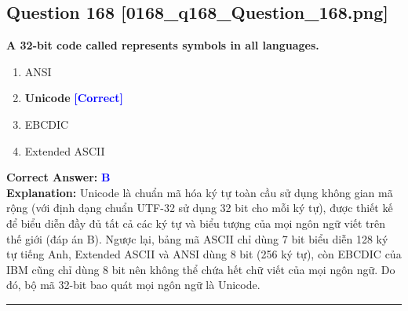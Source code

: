 \documentclass[11pt,a4paper]{article}
\begin{document}
\begin{minipage}{\textwidth}
\subsection*{Question 168 \quad \footnotesize{[0168\_q168\_Question\_168.png]}}
\noindent \textbf{A 32-bit code called represents symbols in all languages.}

\begin{enumerate}[label=\Alph*.]
    \item ANSI
    \item \textbf{Unicode} \hfill \textcolor{blue}{\textbf{[Correct]}}
    \item EBCDIC
    \item Extended ASCII
\end{enumerate}

\noindent \textbf{Correct Answer:} \textcolor{blue}{\textbf{B}} \\[2pt]
\noindent \textbf{Explanation:} Unicode là chuẩn mã hóa ký tự toàn cầu sử dụng không gian mã rộng (với định dạng chuẩn UTF-32 sử dụng 32 bit cho mỗi ký tự), được thiết kế để biểu diễn đầy đủ tất cả các ký tự và biểu tượng của mọi ngôn ngữ viết trên thế giới (đáp án B). Ngược lại, bảng mã ASCII chỉ dùng 7 bit biểu diễn 128 ký tự tiếng Anh, Extended ASCII và ANSI dùng 8 bit (256 ký tự), còn EBCDIC của IBM cũng chỉ dùng 8 bit nên không thể chứa hết chữ viết của mọi ngôn ngữ. Do đó, bộ mã 32-bit bao quát mọi ngôn ngữ là Unicode.

\par\vspace{0.3cm}
\hrule
\vspace{0.3cm}
\end{minipage}
\end{document}
